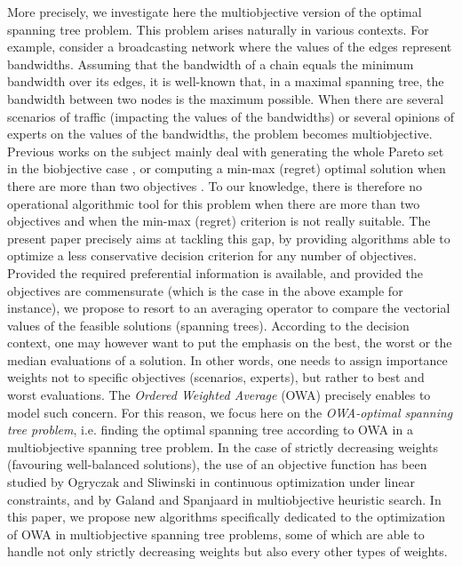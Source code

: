 \documentclass[final,3p,times]{elsarticle}
\begin{document}
More precisely, we investigate here the multiobjective version of the
optimal spanning tree problem. This problem arises naturally in
various contexts. For example, consider a broadcasting network where
the values of the edges represent bandwidths. Assuming that the
bandwidth of a chain equals the minimum bandwidth over its edges, it
is well-known that, in a maximal spanning tree, the bandwidth between
two nodes is the maximum possible. When there are several scenarios of
traffic (impacting the values of the bandwidths) or several opinions
of experts on the values of the bandwidths, the problem becomes
multiobjective. Previous works on the subject mainly deal with generating the whole Pareto set in the biobjective case \cite{AndJL96,HamaR94,SourS08,SteiR08}, or computing a min-max (regret) optimal solution when there are more than two objectives \cite{AisBV09,HamaR94,KouvY97,Warbu85,Yu98}. To our knowledge, there is therefore no operational algorithmic tool for this problem when there are more than two objectives and when the min-max (regret) criterion is not really suitable. The present paper precisely aims at tackling this gap, by providing algorithms able to optimize a less conservative decision criterion for any number of objectives. Provided the required preferential information is available, and provided the objectives are commensurate (which is the case in the above example for instance), we propose to resort to an averaging operator to compare
the vectorial values of the feasible solutions (spanning trees). According to the decision context, one may however want to put the emphasis on the best, the worst or the median evaluations of a solution. In other words, one needs to assign
importance weights not to specific objectives (scenarios, experts), but rather to
best and worst evaluations. The \emph{Ordered Weighted Average} (OWA)
precisely enables to model such concern. For this reason, we focus
here on the \emph{OWA-optimal spanning tree problem}, i.e. finding the
optimal spanning tree according to OWA in a multiobjective spanning
tree problem. 
In the case of strictly decreasing weights (favouring well-balanced
solutions), the use of an  objective function has been studied
by Ogryczak and Sliwinski \cite{Ogryc09,OgryS03} in continuous
optimization under linear constraints, and by Galand and Spanjaard \cite{GalaS07b} in multiobjective heuristic search. In this paper, we propose new algorithms specifically dedicated to the optimization of OWA in multiobjective spanning tree problems, some of which are able to handle not only strictly decreasing weights but also every other types of weights.
\end{document}
